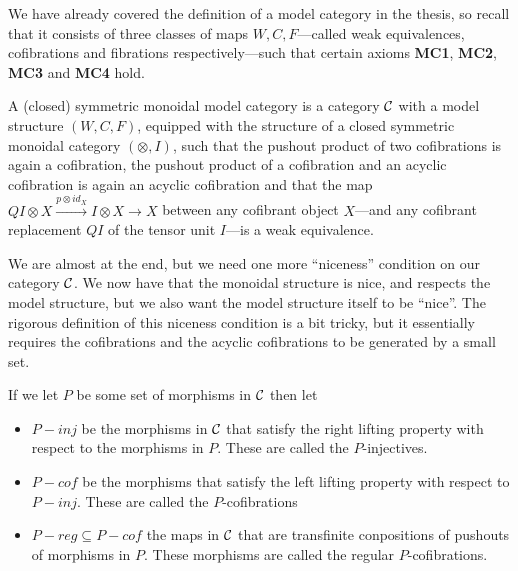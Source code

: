 We have already covered the definition of a model category in the thesis, so recall that it consists of three classes of maps $W, C, F$---called weak equivalences, cofibrations and fibrations respectively---such that certain axioms \textbf{MC1}, \textbf{MC2}, \textbf{MC3} and \textbf{MC4} hold. 

\begin{definition}
A (closed) symmetric monoidal model category is a category $\mathcal{C}$ with a model structure $(W, C, F)$, equipped with the structure of a closed symmetric monoidal category $(\otimes, I)$, such that the pushout product of two cofibrations is again a cofibration, the pushout product of a cofibration and an acyclic cofibration is again an acyclic cofibration and that the map $QI\otimes X \overset{p\otimes id_X}\to I\otimes X \to X$ between any cofibrant object $X$---and any cofibrant replacement $QI$ of the tensor unit $I$---is a weak equivalence. 
\end{definition}

We are almost at the end, but we need one more ``niceness'' condition on our category $\mathcal{C}$. We now have that the monoidal structure is nice, and respects the model structure, but we also want the model structure itself to be ``nice''. The rigorous definition of this niceness condition is a bit tricky, but it essentially requires the cofibrations and the acyclic cofibrations to be generated by a small set. 

If we let $P$ be some set of morphisms in $\mathcal{C}$ then let 
\begin{itemize}
    \item $P-inj$ be the morphisms in $\mathcal{C}$ that satisfy the right lifting property with respect to the morphisms in $P$. These are called the $P$-injectives.
    \item $P-cof$ be the morphisms that satisfy the left lifting property with respect to $P-inj$. These are called the $P$-cofibrations
    \item $P-reg \subseteq P-cof$ the maps in $\mathcal{C}$ that are transfinite conpositions of pushouts of morphisms in $P$. These morphisms are called the regular $P$-cofibrations. 
\end{itemize}

